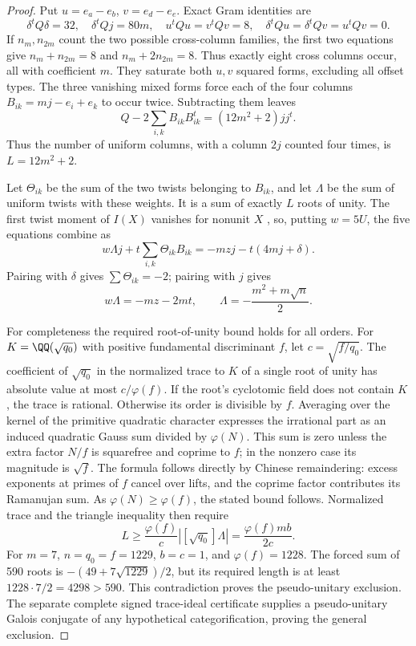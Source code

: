 \begin{proof}
Put $u=e_a-e_b$, $v=e_d-e_e$.  Exact Gram identities are
\[
 \delta^tQ\delta=32,\quad\delta^tQj=80m,\quad
 u^tQu=v^tQv=8,\quad
 \delta^tQu=\delta^tQv=u^tQv=0.
\]
If $n_m,n_{2m}$ count the two possible cross-column families, the first
two equations give $n_m+n_{2m}=8$ and $n_m+2n_{2m}=8$.
Thus exactly eight cross columns occur, all with coefficient $m$.
They saturate both $u,v$ squared forms, excluding all offset types.
The three vanishing mixed forms force each of the four columns
$B_{ik}=mj-e_i+e_k$ to occur twice.  Subtracting them leaves
\[
 Q-2\sum_{i,k}B_{ik}B_{ik}^t=(12m^2+2)jj^t.
\]
Thus the number of uniform columns, with a column $2j$ counted four
times, is $L=12m^2+2$.

Let $\Theta_{ik}$ be the sum of the two twists belonging to $B_{ik}$,
and let $\Lambda$ be the sum of uniform twists with these weights.
It is a sum of exactly $L$ roots of unity.  The first twist moment of
$I(X)$ vanishes for nonunit $X$ \cite[Theorem 2.5]{Ostrik3}, so, putting
$w=5U$, the five equations combine as
\[
 w\Lambda j+t\sum_{i,k}\Theta_{ik}B_{ik}
 =-mzj-t(4mj+\delta).
\]
Pairing with $\delta$ gives $\sum\Theta_{ik}=-2$; pairing with $j$ gives
\[
 w\Lambda=-mz-2mt,\qquad
 \Lambda=-\frac{m^2+m\sqrt n}{2}.
\]

For completeness the required root-of-unity bound holds for all orders.
For $K=\QQ(\sqrt{q_0})$ with positive fundamental discriminant $f$, let
$c=\sqrt{f/q_0}$.  The coefficient of $\sqrt{q_0}$ in the normalized trace
to $K$ of a single root of unity has absolute value at most
$c/\varphi(f)$.  If the root's cyclotomic field does not contain $K$,
the trace is rational.  Otherwise its order is divisible by $f$.
Averaging over the kernel of the primitive quadratic character expresses
the irrational part as an induced quadratic Gauss sum divided by
$\varphi(N)$.  This sum is zero unless the extra factor $N/f$ is squarefree
and coprime to $f$; in the nonzero case its magnitude is $\sqrt f$.
The formula follows directly by Chinese remaindering: excess exponents
at primes of $f$ cancel over lifts, and the coprime factor contributes its
Ramanujan sum.  As $\varphi(N)\ge\varphi(f)$, the stated bound follows.
Normalized trace and the triangle inequality then require
\[
 L\ge\frac{\varphi(f)}c\left|[\sqrt{q_0}]\Lambda\right|
   =\frac{\varphi(f)mb}{2c}.
\]
For $m=7$, $n=q_0=f=1229$, $b=c=1$, and $\varphi(f)=1228$.
The forced sum of 590 roots is $-(49+7\sqrt{1229})/2$, but its required
length is at least $1228\cdot7/2=4298>590$.  This contradiction proves the
pseudo-unitary exclusion.  The separate complete signed trace-ideal
certificate supplies a pseudo-unitary Galois conjugate of any hypothetical
categorification, proving the general exclusion.
\end{proof}

